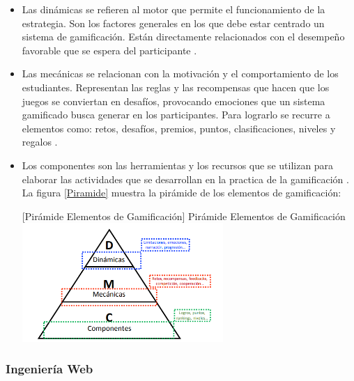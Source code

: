     \begin{itemize}
        \item Las dinámicas se refieren al motor que permite el funcionamiento de la estrategia. Son los factores generales en los que debe estar centrado un sistema de gamificación. Están directamente relacionados con el desempeño favorable que se espera del participante \cite{guevara}.
        
        \item Las mecánicas se relacionan con la motivación y el comportamiento de los estudiantes. Representan las reglas y las recompensas que hacen que los juegos se conviertan en desafíos, provocando emociones que un sistema gamificado busca generar en los participantes. Para lograrlo se recurre a elementos como: retos, desafíos, premios, puntos, clasificaciones, niveles y regalos \cite{guevara}.
        
        \item Los componentes son las herramientas y los recursos que se utilizan para elaborar las actividades que se desarrollan en la practica de la gamificación \cite{werbach}. La figura \ref{Piramide} muestra la pirámide de los elementos de gamificación:
        
        \vspace{2mm}
        \begin{minipage}{0.9\textwidth}
        \centering
        [{Pirámide Elementos de Gamificación}]{ Pirámide Elementos de Gamificación }
        \label{Piramide}
         \includegraphics[width=0.6\textwidth]{Images/piramide}

        \end{minipage}
    \end{itemize}


\subsubsection*{Ingeniería Web}

